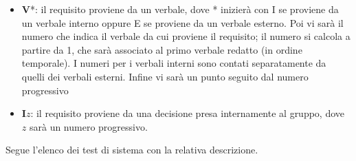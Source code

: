 \begin{itemize}
\begin{itemize}
        \item \textbf{V}*: il requisito proviene da un verbale, dove * inizierà con I se proviene da un verbale interno oppure E se proviene da un verbale esterno.
        Poi vi sarà il numero che indica il verbale da cui proviene il requisito; il numero si calcola a partire da 1, che sarà associato al primo verbale redatto (in ordine temporale). I numeri per i verbali interni sono contati separatamente da quelli dei verbali esterni. Infine vi sarà un punto seguito dal numero progressivo
        \item \textbf{I}$z$: il requisito proviene da una decisione presa internamente al gruppo, dove $z$ sarà un numero progressivo.
    \end{itemize}
\end{itemize}

Segue l'elenco dei test di sistema con la relativa descrizione.

